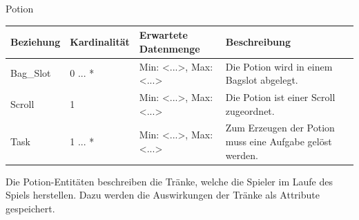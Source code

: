 \begin{entity}{60}{Potion}
\begin{center}
	\begin{longtable}{|m{4cm}|m{}|m{}|m{}|}
 	 \hline
 	 \textbf{Beziehung} & \textbf{Kardinalität} &  \textbf{Erwartete Datenmenge} & \textbf{Beschreibung} \\
  	\hline
  	Bag\_Slot & 0 ... *  & Min: <...>, Max: <...> & Die Potion wird in einem Bagslot abgelegt.\\
	  \hline
  	Scroll & 1  & Min: <...>, Max: <...> & Die Potion ist einer Scroll zugeordnet. \\
	  \hline
  	Task & 1 ... *  & Min: <...>, Max: <...> & Zum Erzeugen der Potion muss eine Aufgabe gelöst werden.\\
	  \hline
	\end{longtable}
\end{center}
Die \glqq Potion\grqq-Entitäten beschreiben die Tränke, welche die Spieler im Laufe des Spiels herstellen. Dazu werden die Auswirkungen der Tränke als Attribute gespeichert. \\\\\\\
\end{entity}

